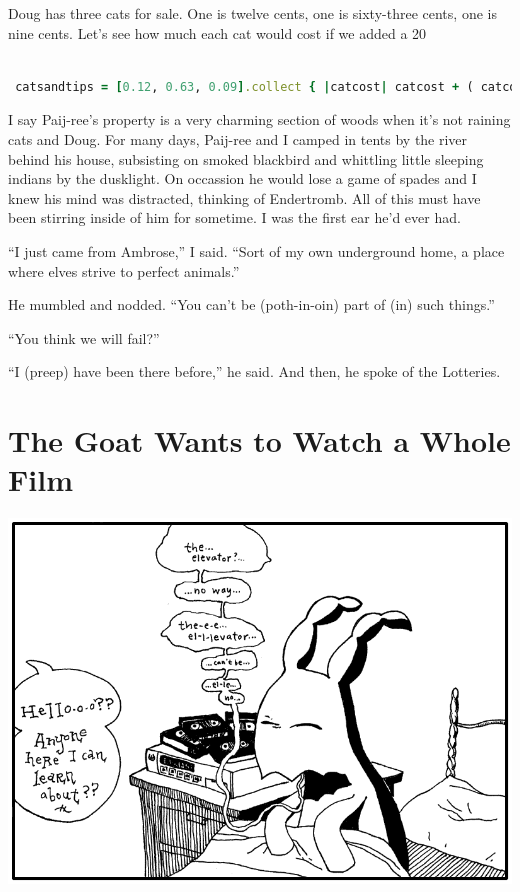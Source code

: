 \documentclass[10pt,twoside]{report}
\begin{document}
Doug has three cats for sale.  One is twelve cents, one is sixty-three
cents, one is nine cents. Let's see how much each cat would cost if we
added a 20%


\begin{lstlisting}[basicstyle=\ttfamily\color{basiccolor},
    commentstyle = \ttfamily\color{commentcolor},
    keywordstyle=\ttfamily\color{keywordscolor},
    stringstyle=\color{stringcolor},
    language=Ruby,
    basicstyle=\small\ttfamily,
    showstringspaces=false,
  ]

 catsandtips = [0.12, 0.63, 0.09].collect { |catcost| catcost + ( catcost * 0.20 ) }

\end{lstlisting}


I say Paij-ree's property is a very charming section of woods when
it's not raining cats and Doug. For many days, Paij-ree and I camped
in tents by the river behind his house, subsisting on smoked blackbird
and whittling little sleeping indians by the dusklight.  On occassion
he would lose a game of spades and I knew his mind was distracted,
thinking of Endertromb.  All of this must have been stirring inside of
him for sometime.  I was the first ear he'd ever had.

``I just came from Ambrose,'' I said.  ``Sort of my own underground
home, a place where elves strive to perfect animals.''

He mumbled and nodded.  ``You can't be (poth-in-oin) part of (in) such
things.''

``You think we will fail?''

``I (preep) have been there before,'' he said.  And then, he spoke of
the Lotteries.

\newpage


\section{The Goat Wants to Watch a Whole Film}



	\includegraphics[width=1.0\textwidth]{cache/42.png}
\end{document}
